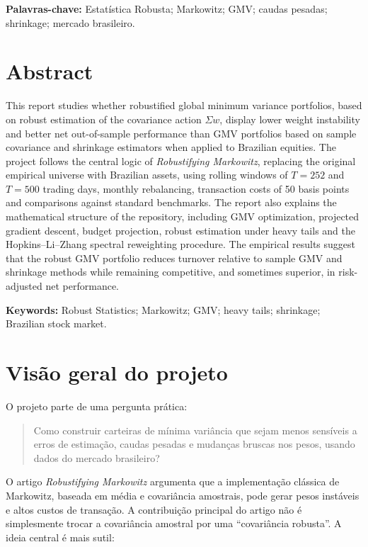 \documentclass[12pt,a4paper]{article}
\begin{document}
\vspace{0.3cm}
\noindent\textbf{Palavras-chave:} Estatística Robusta; Markowitz; GMV; caudas pesadas;
shrinkage; mercado brasileiro.

\newpage

\section*{Abstract}
This report studies whether robustified global minimum variance portfolios, based on robust
estimation of the covariance action $\Sigma w$, display lower weight instability and better
net out-of-sample performance than GMV portfolios based on sample covariance and shrinkage
estimators when applied to Brazilian equities. The project follows the central logic of
\emph{Robustifying Markowitz}, replacing the original empirical universe with Brazilian
assets, using rolling windows of $T=252$ and $T=500$ trading days, monthly rebalancing,
transaction costs of 50 basis points and comparisons against standard benchmarks. The report
also explains the mathematical structure of the repository, including GMV optimization,
projected gradient descent, budget projection, robust estimation under heavy tails and the
Hopkins--Li--Zhang spectral reweighting procedure. The empirical results suggest that the
robust GMV portfolio reduces turnover relative to sample GMV and shrinkage methods while
remaining competitive, and sometimes superior, in risk-adjusted net performance.

\vspace{0.3cm}
\noindent\textbf{Keywords:} Robust Statistics; Markowitz; GMV; heavy tails; shrinkage;
Brazilian stock market.

\newpage
\tableofcontents
\newpage
\listoffigures
\newpage
\listoftables
\newpage
{}

\section{Visão geral do projeto}

O projeto parte de uma pergunta prática:

\begin{quote}
Como construir carteiras de mínima variância que sejam menos sensíveis a erros de estimação,
caudas pesadas e mudanças bruscas nos pesos, usando dados do mercado brasileiro?
\end{quote}

O artigo \emph{Robustifying Markowitz} argumenta que a implementação clássica de Markowitz,
baseada em média e covariância amostrais, pode gerar pesos instáveis e altos custos de
transação. A contribuição principal do artigo não é simplesmente trocar a covariância amostral
por uma ``covariância robusta''. A ideia central é mais sutil:
\end{document}
